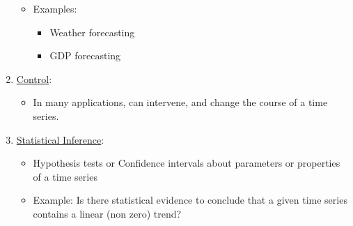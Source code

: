 \begin{enumerate}[label=\Alph*.]
\begin{itemize}
        \item Examples:
        \begin{itemize}
            \item Weather forecasting
            \item GDP forecasting
        \end{itemize}
    \end{itemize}
    \item \underline{Control}:
    \begin{itemize}
        \item In many applications, can intervene, and change the course of a time series.
    \end{itemize}
    \item \underline{Statistical Inference}:
    \begin{itemize}
        \item Hypothesis tests or Confidence intervals about parameters or properties of a time series
        \item Example: \quad Is there statistical evidence to conclude that a given time series contains a linear (non zero) trend?
    \end{itemize}
\end{enumerate}